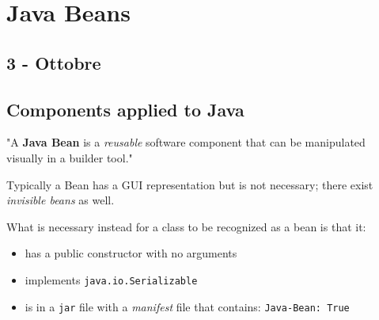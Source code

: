 \chapter{Java Beans}
\section*{3 - Ottobre}
\section{Components applied to Java}
"A \textbf{Java Bean} is a \textit{reusable} software component that can be
manipulated visually in a builder tool."

Typically a Bean has a GUI representation but is not necessary; there exist \textit{invisible beans} as well.
{What is necessary instead for a class to be recognized as a bean is that it:\ns
\begin{itemize}
    \item has a public constructor with no arguments
    \item implements \lstinline{java.io.Serializable}
    \item is in a \lstinline{jar} file with a \textit{manifest} file that contains: \lstinline{Java-Bean: True}
\end{itemize}}

